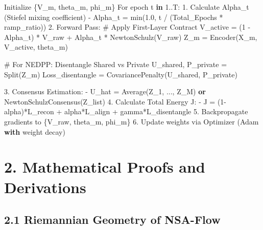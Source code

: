 \documentclass[
  letterpaper,
]{report}
\newenvironment{Shaded}{\begin{snugshade}}{\end{snugshade}}
\newcommand{\BuiltInTok}[1]{\textcolor[rgb]{0.00,0.23,0.31}{#1}}
\newcommand{\CommentTok}[1]{\textcolor[rgb]{0.37,0.37,0.37}{#1}}
\newcommand{\ControlFlowTok}[1]{\textcolor[rgb]{0.00,0.23,0.31}{\textbf{#1}}}
\newcommand{\DecValTok}[1]{\textcolor[rgb]{0.68,0.00,0.00}{#1}}
\newcommand{\FloatTok}[1]{\textcolor[rgb]{0.68,0.00,0.00}{#1}}
\newcommand{\KeywordTok}[1]{\textcolor[rgb]{0.00,0.23,0.31}{\textbf{#1}}}
\newcommand{\NormalTok}[1]{\textcolor[rgb]{0.00,0.23,0.31}{#1}}
\newcommand{\OperatorTok}[1]{\textcolor[rgb]{0.37,0.37,0.37}{#1}}
\begin{document}
\begin{Shaded}
\begin{Highlighting}[]
\NormalTok{Initialize \{V\_m, theta\_m, phi\_m\}}
\NormalTok{For epoch t }\KeywordTok{in} \FloatTok{1.}\NormalTok{.T:}
    \FloatTok{1.}\NormalTok{ Calculate Alpha\_t (Stiefel mixing coefficient)}
       \OperatorTok{{-}}\NormalTok{ Alpha\_t }\OperatorTok{=} \BuiltInTok{min}\NormalTok{(}\FloatTok{1.0}\NormalTok{, t }\OperatorTok{/}\NormalTok{ (Total\_Epochs }\OperatorTok{*}\NormalTok{ ramp\_ratio))}
    \FloatTok{2.}\NormalTok{ Forward Pass:}
       \CommentTok{\# Apply First{-}Layer Contract}
\NormalTok{       V\_active }\OperatorTok{=}\NormalTok{ (}\DecValTok{1} \OperatorTok{{-}}\NormalTok{ Alpha\_t) }\OperatorTok{*}\NormalTok{ V\_raw }\OperatorTok{+}\NormalTok{ Alpha\_t }\OperatorTok{*}\NormalTok{ NewtonSchulz(V\_raw)}
\NormalTok{       Z\_m }\OperatorTok{=}\NormalTok{ Encoder(X\_m, V\_active, theta\_m)}
       
       \CommentTok{\# For NEDPP: Disentangle Shared vs Private}
\NormalTok{       U\_shared, P\_private }\OperatorTok{=}\NormalTok{ Split(Z\_m)}
\NormalTok{       Loss\_disentangle }\OperatorTok{=}\NormalTok{ CovariancePenalty(U\_shared, P\_private)}
       
    \FloatTok{3.}\NormalTok{ Consensus Estimation:}
       \OperatorTok{{-}}\NormalTok{ U\_hat }\OperatorTok{=}\NormalTok{ Average(Z\_1, ..., Z\_M) }\KeywordTok{or}\NormalTok{ NewtonSchulzConsensus(Z\_list)}
    \FloatTok{4.}\NormalTok{ Calculate Total Energy J:}
       \OperatorTok{{-}}\NormalTok{ J }\OperatorTok{=}\NormalTok{ (}\DecValTok{1}\OperatorTok{{-}}\NormalTok{alpha)}\OperatorTok{*}\NormalTok{L\_recon }\OperatorTok{+}\NormalTok{ alpha}\OperatorTok{*}\NormalTok{L\_align }\OperatorTok{+}\NormalTok{ gamma}\OperatorTok{*}\NormalTok{L\_disentangle}
    \FloatTok{5.}\NormalTok{ Backpropagate gradients to \{V\_raw, theta\_m, phi\_m\}}
    \FloatTok{6.}\NormalTok{ Update weights via Optimizer (Adam }\ControlFlowTok{with}\NormalTok{ weight decay)}
\end{Highlighting}
\end{Shaded}

\section{2. Mathematical Proofs and
Derivations}\label{mathematical-proofs-and-derivations}

\subsection{2.1 Riemannian Geometry of
NSA-Flow}\label{riemannian-geometry-of-nsa-flow}
\end{document}

